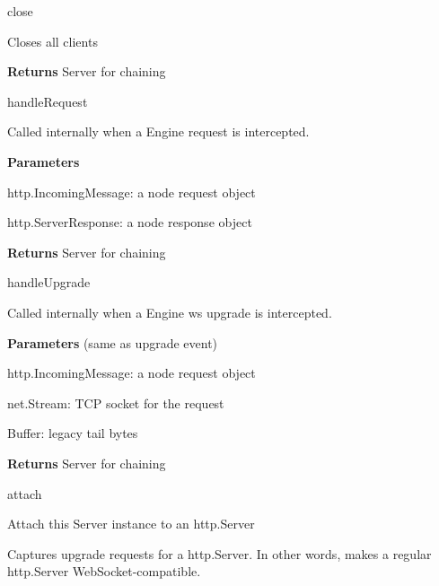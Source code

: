 \begin{DoxyItemize}
\begin{DoxyItemize}
\begin{DoxyItemize}
\end{DoxyItemize}
\end{DoxyItemize}
\item {\ttfamily close}
\begin{DoxyItemize}
\item Closes all clients
\item {\bfseries Returns} {\ttfamily Server} for chaining
\end{DoxyItemize}
\item {\ttfamily handle\+Request}
\begin{DoxyItemize}
\item Called internally when a {\ttfamily Engine} request is intercepted.
\item {\bfseries Parameters}
\begin{DoxyItemize}
\item {\ttfamily http.\+Incoming\+Message}\+: a node request object
\item {\ttfamily http.\+Server\+Response}\+: a node response object
\end{DoxyItemize}
\item {\bfseries Returns} {\ttfamily Server} for chaining
\end{DoxyItemize}
\item {\ttfamily handle\+Upgrade}
\begin{DoxyItemize}
\item Called internally when a {\ttfamily Engine} ws upgrade is intercepted.
\item {\bfseries Parameters} (same as {\ttfamily upgrade} event)
\begin{DoxyItemize}
\item {\ttfamily http.\+Incoming\+Message}\+: a node request object
\item {\ttfamily net.\+Stream}\+: T\+CP socket for the request
\item {\ttfamily Buffer}\+: legacy tail bytes
\end{DoxyItemize}
\item {\bfseries Returns} {\ttfamily Server} for chaining
\end{DoxyItemize}
\item {\ttfamily attach}
\begin{DoxyItemize}
\item Attach this Server instance to an {\ttfamily http.\+Server}
\item Captures {\ttfamily upgrade} requests for a {\ttfamily http.\+Server}. In other words, makes a regular http.\+Server Web\+Socket-\/compatible.

\end{DoxyItemize}
\end{DoxyItemize}

